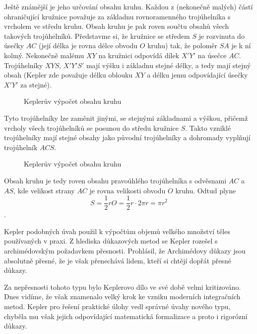       
      Ještě známější je jeho určování obsahu kruhu. Každou z (nekonečně malých) částí ohraničující
      kružnice považuje za základnu rovnoramenného trojúhelníka s vrcholem ve středu kruhu. Obsah
      kruhu je pak roven součtu obsahů všech takových trojúhelníků. Představme si, že kružnice se
      středem \(S\) je rozvinuta do úsečky \(AC\) (její délka je rovna délce obvodu \(O\) kruhu)
      tak, že poloměr \(SA\) je k ní kolmý. Nekonečně malému \(XY\) na kružnici odpovídá dílek
      \(X′Y′\) na úsečce \(AC\). Trojúhelníky \(XYS\), \(X′Y′S′\) mají výšku i základnu stejné
      délky, a tedy mají stejný obsah (Kepler zde považuje délku oblouku \(XY\) a délku jemu
      odpovídající úsečky \(X′Y′\) za stejné).

      \begin{figure}[ht!]
        \centering
        \caption{Keplerův výpočet obsahu kruhu}
        \label{mai:figXXX}
      \end{figure}

      Tyto trojúhelníky lze zaměnit jinými, se stejnými základnami a výškou, přičemž vrcholy všech
      trojúhelníků se posunou do středu kružnice \(S\). Takto vzniklé trojúhelníky mají stejné
      obsahy jako původní trojúhelníky a dohromady vyplňují trojúhelník \(ACS\).

      \begin{figure}[ht!]
        \centering
        \caption{Keplerův výpočet obsahu kruhu}
        \label{mai:figXXX}
      \end{figure}

      Obsah kruhu je tedy roven obsahu pravoúhlého trojúhelníka s odvěsnami \(AC\) a \(AS\), kde
      velikost strany \(AC\) je rovna velikosti obvodu \(O\) kruhu. Odtud plyne \[S = \dfrac{1}{2}rO
      = \dfrac{1}{2}r\cdot2πr = πr^2\].

      Kepler podobných úvah použil k výpočtům objemů velkého množství těles používaných v praxi. Z
      hlediska důkazových metod se Kepler rozešel s archimédovským požadavkem přesnosti. Prohlásil,
      že Archimédovy důkazy jsou absolutně přesné, že je však přenechává lidem, kteří si chtějí
      dopřát přesné důkazy.

      Za nepřesnosti tohoto typu bylo Keplerovo dílo ve své době velmi kritizováno. Dnes vidíme, že
      však znamenalo velký krok ke vzniku moderních integračních metod. Kepler pro řešení praktické
      úlohy vedl správné úvahy nového typu, chyběla mu však jejich odpovídající matematická
      formalizace a proto i rigorózní důkazy.

